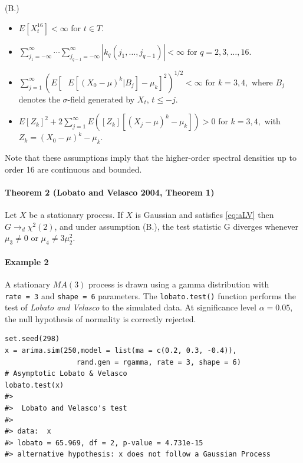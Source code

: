 (B.)

\begin{itemize}
\item
  \(E[X_t^{16}] < \infty\) for \(t \in T.\)
\item
  \(\sum_{j_1 = -\infty}^{\infty}\cdots \sum_{j_{q-1} = -\infty}^{\infty} |k_q(j_1,\ldots,j_{q-1})| < \infty \text{ for } q=2,3,\ldots,16.\)
\item
  \(\sum_{j=1}^{\infty}\left(E \left[\text{ } E[(X_0-\mu)^k|B_j] -\mu_k\right]^2 \right)^{1/2} < \infty \text{  for } k = 3,4,\) where \(B_j\) denotes the \(\sigma\)-field generated by \(X_t\), \(t \leq -j.\)
\item
  \(E\left[Z_k \right]^2 +2\sum_{j=1}^{\infty}E\left(\left[Z_k \right] \left[ (X_j -\mu)^k -\mu_k \right] \right) > 0\) for \(k = 3,4,\) with \(Z_k=(X_0 -\mu)^k -\mu_k.\)
\end{itemize}

Note that these assumptions imply that the higher-order spectral densities up to order 16 are continuous and bounded.

\hypertarget{theorem-2-lobato2004-theorem-1}{%
\paragraph{Theorem 2 (Lobato and Velasco 2004, Theorem 1)}\label{theorem-2-lobato2004-theorem-1}}

Let \(X\) be a stationary process. If \(X\) is Gaussian and satisfies \eqref{eq:aLV} then \(G \to_d \chi^2(2)\), and under assumption (B.), the test statistic G diverges whenever \(\mu_3 \neq 0\) or \(\mu_4 \neq 3\mu_2^2.\)

\hypertarget{example-2}{%
\paragraph{Example 2}\label{example-2}}

A stationary \(MA(3)\) process is drawn using a gamma distribution with \texttt{rate\ =\ 3} and \texttt{shape\ =\ 6} parameters. The \texttt{lobato.test()} function performs the test of \emph{Lobato and Velasco} to the simulated data. At significance level \(\alpha = 0.05\), the null hypothesis of normality is correctly rejected.

\begin{verbatim}
set.seed(298)
x = arima.sim(250,model = list(ma = c(0.2, 0.3, -0.4)),
                 rand.gen = rgamma, rate = 3, shape = 6)
# Asymptotic Lobato & Velasco
lobato.test(x)
#> 
#>  Lobato and Velasco's test
#> 
#> data:  x
#> lobato = 65.969, df = 2, p-value = 4.731e-15
#> alternative hypothesis: x does not follow a Gaussian Process
\end{verbatim}

